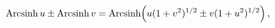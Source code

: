 \[\mathop{\mathrm{Arcsinh}\/}\nolimits u\pm\mathop{\mathrm{Arcsinh}\/}\nolimits v%
=\mathop{\mathrm{Arcsinh}\/}\nolimits\!\left(u(1+v^{2})^{1/2}\pm v(1+u^{2})^{1%
/2}\right),\]